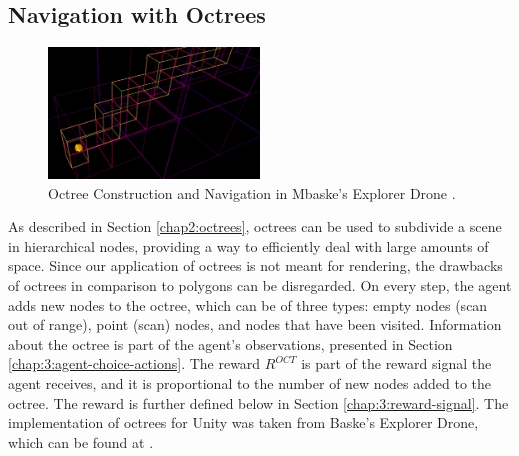 \subsection{Navigation with Octrees}
\begin{figure}[!ht]
        \centering
        \includegraphics[width=0.5\textwidth]{images/octree-explorer-drone.png}
        \caption{Octree Construction and Navigation in Mbaske's Explorer Drone \cite{github-mbaske-explorer-drone}.
        }
        \label{fig:gridsensor-3d}
\end{figure}

As described in Section \ref{chap2:octrees}, octrees can be used to subdivide a scene in hierarchical nodes, providing a  way to efficiently deal with large amounts of space. Since our application of octrees is not meant for rendering, the drawbacks of octrees in comparison to polygons can be disregarded. 
On every step, the agent adds new nodes to the octree, which can be of three types: empty nodes (scan out of range), point (scan) nodes, and nodes that have been visited.
Information about the octree is part of the agent's observations, presented in Section \ref{chap:3:agent-choice-actions}.
The reward $R^{OCT}$ is part of the reward signal the agent receives, and it is proportional to the number of new nodes added to the octree. The reward is further defined below in Section \ref{chap:3:reward-signal}.
The implementation of octrees for Unity was taken from Baske's Explorer Drone, which can be found at \cite{github-mbaske-gridsensor}.




